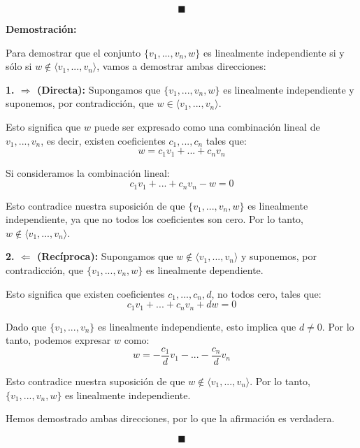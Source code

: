 \documentclass{article}
\begin{document}
\[ \blacksquare \]




\textbf{Demostración:}

Para demostrar que el conjunto \( \{v_1,...,v_n,w\} \) es linealmente independiente si y sólo si \( w \notin \langle v_1,...,v_n \rangle \), vamos a demostrar ambas direcciones:

\textbf{1. \( \Rightarrow \) (Directa):} Supongamos que \( \{v_1,...,v_n,w\} \) es linealmente independiente y suponemos, por contradicción, que \( w \in \langle v_1,...,v_n \rangle \). 

Esto significa que \( w \) puede ser expresado como una combinación lineal de \( v_1,...,v_n \), es decir, existen coeficientes \( c_1,...,c_n \) tales que:
\[ w = c_1 v_1 + ... + c_n v_n \]

Si consideramos la combinación lineal:
\[ c_1 v_1 + ... + c_n v_n - w = 0 \]

Esto contradice nuestra suposición de que \( \{v_1,...,v_n,w\} \) es linealmente independiente, ya que no todos los coeficientes son cero. Por lo tanto, \( w \notin \langle v_1,...,v_n \rangle \).

\textbf{2. \( \Leftarrow \) (Recíproca):} Supongamos que \( w \notin \langle v_1,...,v_n \rangle \) y suponemos, por contradicción, que \( \{v_1,...,v_n,w\} \) es linealmente dependiente.

Esto significa que existen coeficientes \( c_1,...,c_n, d \), no todos cero, tales que:
\[ c_1 v_1 + ... + c_n v_n + d w = 0 \]

Dado que \( \{v_1,...,v_n\} \) es linealmente independiente, esto implica que \( d \neq 0 \). Por lo tanto, podemos expresar \( w \) como:
\[ w = -\frac{c_1}{d} v_1 - ... - \frac{c_n}{d} v_n \]

Esto contradice nuestra suposición de que \( w \notin \langle v_1,...,v_n \rangle \). Por lo tanto, \( \{v_1,...,v_n,w\} \) es linealmente independiente.

Hemos demostrado ambas direcciones, por lo que la afirmación es verdadera.

\[ \blacksquare \]
\end{document}
